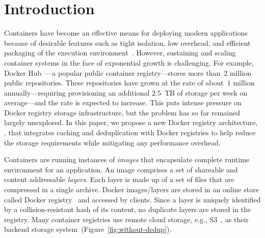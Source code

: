 \section{Introduction}
 \label{sec:intro}

\vspace{-2pt}
 
 Containers 
 have become an effective means for deploying modern applications because 
 of desirable features such as tight isolation, low overhead, and efficient packaging of the execution environment~\cite{docker}. 
 However,
 sustaining and scaling container systems in the face of exponential growth is challenging. 
 For example, Docker Hub~\cite{docker-hub}---a popular public container registry---stores more than~$2$ million public repositories. These repositories have grown at the rate of about~$1$ million annually---requiring provisioning an additional $2.5$~TB of storage per week on average---and the rate is expected to increase.
 This puts intense pressure on Docker registry storage infrastructure, but the problem has so far remained largely unexplored.
 In this paper, we propose a new Docker registry architecture, \sysname,
 that integrates caching and deduplication with Docker registries to help reduce the storage requirements while mitigating any performance overhead.
 
Containers are running instances of \emph{images} that encapsulate complete runtime environment for an application.
An image comprises a set of shareable and content addressable \emph{layers}.
Each layer is made up of a set of files that are compressed in a single archive. 
Docker images/layers are stored in an online store called Docker registry~\cite{docker-hub} and accessed by clients. %
Since a layer is uniquely identified by a collision-resistant hash of its content, 
no duplicate layers are stored in the registry.
Many container registries use remote cloud storage, e.g., S3~\cite{s3}, 
as their backend storage system~(Figure~\ref{fig:without-dedup}).



